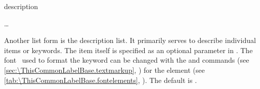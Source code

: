   \begin{Declaration}
    \begin{Environment}{description}
      \begin{Body}
         \dots
        \BodyDots
      \end{Body}
    \end{Environment}
  \end{Declaration}%
  Another list
  form is the description list. It primarily serves
  to describe individual items or keywords. The item itself is specified as an
  optional parameter in . %
  The font%
  \ used to format the keyword can be changed with the
   and
   commands (see
  \autoref{sec:\ThisCommonLabelBase.textmarkup},
  ) for the
  element (see \autoref{tab:\ThisCommonLabelBase.fontelements},
  ). The default is
  \linebreak[1]%
  .%
